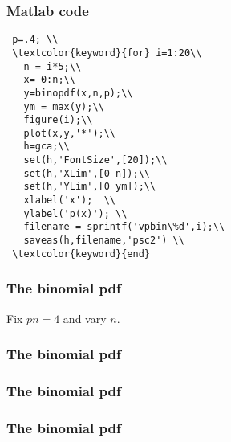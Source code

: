 \begin{frame}[fragile]\frametitle{Matlab code}

{\tiny

\begin{lstlisting}
 p=.4; \\
 \textcolor{keyword}{for} i=1:20\\
   n = i*5;\\
   x= 0:n;\\
   y=binopdf(x,n,p);\\
   ym = max(y);\\
   figure(i);\\
   plot(x,y,'*');\\
   h=gca;\\
   set(h,'FontSize',[20]);\\
   set(h,'XLim',[0 n]);\\
   set(h,'YLim',[0 ym]);\\
   xlabel('x');  \\
   ylabel('p(x)'); \\
   filename = sprintf('vpbin\%d',i);\\
   saveas(h,filename,'psc2') \\
 \textcolor{keyword}{end}
\end{lstlisting}
}
\end{frame}



\begin{frame}[fragile]\frametitle{The binomial pdf}

Fix $pn= 4$ and vary $n$. 

\end{frame}



\begin{frame}[fragile]\frametitle{The binomial pdf}


\end{frame}

\begin{frame}[fragile]\frametitle{The binomial pdf}


\end{frame}

\begin{frame}[fragile]\frametitle{The binomial pdf}


\end{frame}

